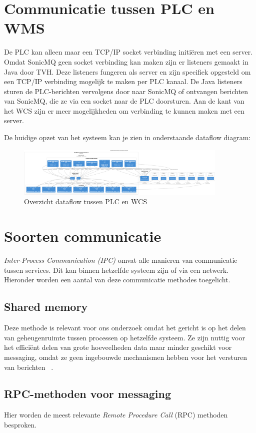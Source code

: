 \section{Communicatie tussen PLC en WMS}

De PLC kan alleen maar een TCP/IP socket verbinding initiëren met een server.
Omdat SonicMQ geen socket verbinding kan maken zijn er listeners gemaakt in Java door TVH.
Deze listeners fungeren als server en zijn specifiek opgesteld om een TCP/IP verbinding mogelijk te maken per PLC kanaal.
De Java listeners sturen de PLC-berichten vervolgens door naar SonicMQ of ontvangen berichten van SonicMQ, 
die ze via een socket naar de PLC doorsturen.
Aan de kant van het WCS zijn er meer mogelijkheden om verbinding te kunnen maken met een server.

De huidige opzet van het systeem kan je zien in onderstaande dataflow diagram:
\begin{figure}[h!]
  \includegraphics[width=0.9\textwidth]{img/plc-wcs_dataflow.png}
  \caption[Dataflow PLC]{\label{fig:dataflow-plc} Overzicht dataflow tussen PLC en WCS}
\end{figure}

\section{Soorten communicatie}
\emph{Inter-Process Communication (IPC)} omvat alle manieren van communicatie tussen services. 
Dit kan binnen hetzelfde systeem zijn of via een netwerk. 
Hieronder worden een aantal van deze communicatie methodes toegelicht.

\subsection{Shared memory}
Deze methode is relevant voor ons onderzoek omdat het gericht is op het delen van geheugenruimte 
tussen processen op hetzelfde systeem. 
Ze zijn nuttig voor het efficiënt delen van grote hoeveelheden data maar minder geschikt voor messaging, 
omdat ze geen ingebouwde mechanismen hebben voor het versturen van berichten ~\autocite{Dinari2020}.
 
\subsection{RPC-methoden voor messaging}
Hier worden de meest relevante \emph{Remote Procedure Call} (RPC) methoden besproken.

